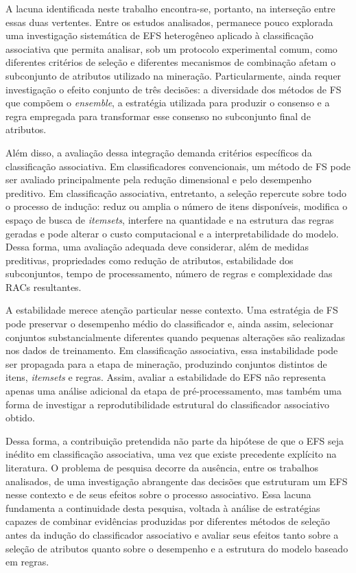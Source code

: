 A lacuna identificada neste trabalho encontra-se, portanto, na interseção entre
essas duas vertentes. Entre os estudos analisados, permanece pouco explorada uma
investigação sistemática de EFS heterogêneo aplicado à classificação associativa
que permita analisar, sob um protocolo experimental comum, como diferentes
critérios de seleção e diferentes mecanismos de combinação afetam o subconjunto
de atributos utilizado na mineração. Particularmente, ainda requer investigação
o efeito conjunto de três decisões: a diversidade dos métodos de FS que compõem
o \textit{ensemble}, a estratégia utilizada para produzir o consenso e a regra
empregada para transformar esse consenso no subconjunto final de atributos.

Além disso, a avaliação dessa integração demanda critérios específicos da
classificação associativa. Em classificadores convencionais, um método de FS pode
ser avaliado principalmente pela redução dimensional e pelo desempenho
preditivo. Em classificação associativa, entretanto, a seleção repercute sobre
todo o processo de indução: reduz ou amplia o número de itens disponíveis,
modifica o espaço de busca de \textit{itemsets}, interfere na quantidade e na
estrutura das regras geradas e pode alterar o custo computacional e a
interpretabilidade do modelo. Dessa forma, uma avaliação adequada deve considerar,
além de medidas preditivas, propriedades como redução de atributos, estabilidade
dos subconjuntos, tempo de processamento, número de regras e complexidade das
RACs resultantes.

A estabilidade merece atenção particular nesse contexto. Uma estratégia de FS
pode preservar o desempenho médio do classificador e, ainda assim, selecionar
conjuntos substancialmente diferentes quando pequenas alterações são realizadas
nos dados de treinamento. Em classificação associativa, essa instabilidade pode
ser propagada para a etapa de mineração, produzindo conjuntos distintos de itens,
\textit{itemsets} e regras. Assim, avaliar a estabilidade do EFS não representa
apenas uma análise adicional da etapa de pré-processamento, mas também uma forma
de investigar a reprodutibilidade estrutural do classificador associativo obtido.

Dessa forma, a contribuição pretendida não parte da hipótese de que o EFS seja
inédito em classificação associativa, uma vez que existe precedente explícito na
literatura. O problema de pesquisa decorre da ausência, entre os trabalhos
analisados, de uma investigação abrangente das decisões que estruturam um EFS
nesse contexto e de seus efeitos sobre o processo associativo. Essa lacuna
fundamenta a continuidade desta pesquisa, voltada à análise de estratégias capazes
de combinar evidências produzidas por diferentes métodos de seleção antes da
indução do classificador associativo e avaliar seus efeitos tanto sobre a seleção
de atributos quanto sobre o desempenho e a estrutura do modelo baseado em regras.